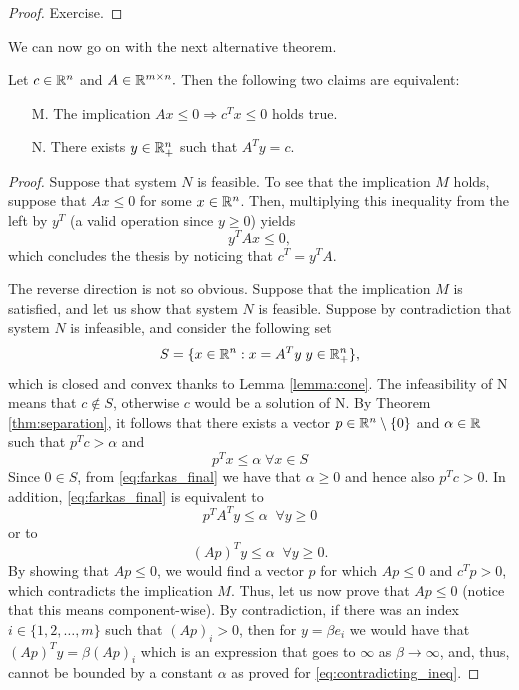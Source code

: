 \documentclass[10pt,a4paper]{article}
\begin{document}
\begin{proof}
	Exercise.
\end{proof}
\noindent We can now go on with the next alternative theorem.
\begin{lemma}\label{lemma:farkas}
	Let $c\in \mathbb{R}^n$ and $A\in \mathbb{R}^{m\times n}.$ Then the following two claims are equivalent:
	\begin{itemize}
		\item[M.] The implication $Ax\leq 0 \Rightarrow c^Tx\leq 0$ holds true. 
		\item[N.] There exists $y\in \mathbb{R}^n_+$ such that $A^Ty=c.$
	\end{itemize}
\end{lemma}
\begin{proof}
	Suppose that system $N$ is feasible. To see that the implication $M$ holds, suppose that $Ax\leq 0$ for some $x\in \mathbb{R}^n$. Then, multiplying this inequality from the left by $y^T$ (a valid operation since $y\geq0$) yields 
	\begin{equation*}
		y^TAx\leq 0,
	\end{equation*}
which concludes the thesis by noticing that $c^T=y^TA$. 
\par The reverse direction is not so obvious. Suppose that the implication $M$ is satisfied, and
let us show that system $N$ is feasible. Suppose by contradiction that system $N$ is infeasible,
and consider the following set
\begin{equation*}
	S=\{x\in\mathbb{R}^n: x= A^Ty \; y\in \mathbb{R}^n_+\},
\end{equation*}
which is closed and convex thanks to Lemma \ref{lemma:cone}. The infeasibility of N means that $c\not \in S$, otherwise $c$ would be a solution of N. By Theorem \ref{thm:separation}, it follows that there exists a vector $p\in \mathbb{R}^n \setminus \{0\}$ and $\alpha\in \mathbb{R}$ such that $p^Tc>\alpha$ and 
\begin{equation}\label{eq:farkas_final}
	p^Tx\leq \alpha \; \forall x\in S
\end{equation}
Since $0\in S$, from \eqref{eq:farkas_final} we have that $\alpha\geq 0$ and hence also $p^Tc>0$. In addition, \eqref{eq:farkas_final} is equivalent to 
\begin{equation*}
	p^TA^Ty\leq \alpha \;\; \forall y\geq 0 
\end{equation*}
or to 
\begin{equation}\label{eq:contradicting_ineq}
	(Ap)^Ty\leq \alpha \;\; \forall y\geq 0.
\end{equation}
By showing that $Ap \leq 0$, we would find a vector $p$ for which $Ap\leq 0$ and $c^Tp>0$, which contradicts the implication $M$. Thus, let us now prove that $Ap \leq 0$ (notice that this means component-wise).  By contradiction, if there was an index $i\in \{1,2, \dots,m\}$ such that $(Ap)_i>0$, then for $y=\beta e_i$ we would have that $(Ap)^Ty = \beta (Ap)_i$ which is an expression that goes to $\infty$ as $\beta\to \infty$, and, thus, cannot be bounded by a constant $\alpha$ as proved for \eqref{eq:contradicting_ineq}.
\end{proof}
\end{document}
